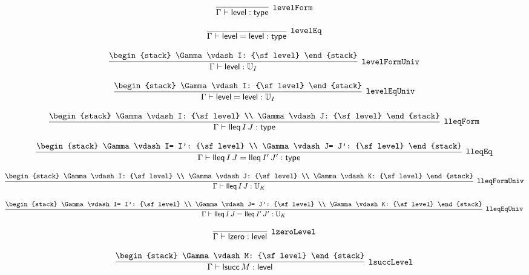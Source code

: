 \[
\infer[{\tt levelForm}]{\Gamma \vdash {\sf level}: {\sf type}}{}
\]

\[
\infer[{\tt levelEq}]{\Gamma \vdash {\sf level}= {\sf level}: {\sf type}}{}
\]

\[
\infer[{\tt levelFormUniv}]{\Gamma \vdash {\sf level}: {\Bbb U}_{I}}{
\begin{stack}
\Gamma \vdash I: {\sf level}
\end{stack}}
\]

\[
\infer[{\tt levelEqUniv}]{\Gamma \vdash {\sf level}= {\sf level}: {\Bbb U}_{I}}{
\begin{stack}
\Gamma \vdash I: {\sf level}
\end{stack}}
\]

\[
\infer[{\tt lleqForm}]{\Gamma \vdash {\sf lleq}\,I\,J: {\sf type}}{
\begin{stack}
\Gamma \vdash I: {\sf level}
\\
\Gamma \vdash J: {\sf level}
\end{stack}}
\]

\[
\infer[{\tt lleqEq}]{\Gamma \vdash {\sf lleq}\,I\,J= {\sf lleq}\,I'\,J': {\sf type}}{
\begin{stack}
\Gamma \vdash I= I': {\sf level}
\\
\Gamma \vdash J= J': {\sf level}
\end{stack}}
\]

\[
\infer[{\tt lleqFormUniv}]{\Gamma \vdash {\sf lleq}\,I\,J: {\Bbb U}_{K}}{
\begin{stack}
\Gamma \vdash I: {\sf level}
\\
\Gamma \vdash J: {\sf level}
\\
\Gamma \vdash K: {\sf level}
\end{stack}}
\]

\[
\infer[{\tt lleqEqUniv}]{\Gamma \vdash {\sf lleq}\,I\,J= {\sf lleq}\,I'\,J': {\Bbb U}_{K}}{
\begin{stack}
\Gamma \vdash I= I': {\sf level}
\\
\Gamma \vdash J= J': {\sf level}
\\
\Gamma \vdash K: {\sf level}
\end{stack}}
\]

\[
\infer[{\tt lzeroLevel}]{\Gamma \vdash {\sf lzero}: {\sf level}}{}
\]

\[
\infer[{\tt lsuccLevel}]{\Gamma \vdash {\sf lsucc}\,M: {\sf level}}{
\begin{stack}
\Gamma \vdash M: {\sf level}
\end{stack}}
\]

